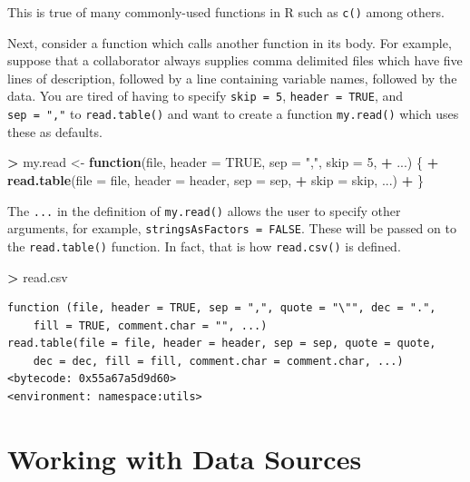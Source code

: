 \documentclass[]{krantz}
\makeatletter
\newenvironment{Shaded}{\begin{snugshade}}{\end{snugshade}}
\newcommand{\KeywordTok}[1]{\textcolor[rgb]{0.27,0.27,0.27}{\textbf{#1}}}
\newcommand{\DataTypeTok}[1]{\textcolor[rgb]{0.27,0.27,0.27}{#1}}
\newcommand{\DecValTok}[1]{\textcolor[rgb]{0.06,0.06,0.06}{#1}}
\newcommand{\StringTok}[1]{\textcolor[rgb]{0.5,0.5,0.5}{#1}}
\newcommand{\OtherTok}[1]{\textcolor[rgb]{0.37,0.37,0.37}{#1}}
\newcommand{\ControlFlowTok}[1]{\textcolor[rgb]{0.27,0.27,0.27}{\textbf{#1}}}
\newcommand{\OperatorTok}[1]{\textcolor[rgb]{0.43,0.43,0.43}{\textbf{#1}}}
\newcommand{\NormalTok}[1]{#1}
\newenvironment{kframe}{%
\medskip{}
\setlength{\fboxsep}{.8em}
 \def\at@end@of@kframe{}%
 \ifinner\ifhmode%
  \def\at@end@of@kframe{\end{minipage}}%
  \begin{minipage}{\columnwidth}%
 \fi\fi%
 \def\FrameCommand##1{\hskip\@totalleftmargin \hskip-\fboxsep
 \colorbox{shadecolor}{##1}\hskip-\fboxsep
     \hskip-\linewidth \hskip-\@totalleftmargin \hskip\columnwidth}%
 \MakeFramed {\advance\hsize-\width
   \@totalleftmargin\z@ \linewidth\hsize
   \@setminipage}}%
 {\par\unskip\endMakeFramed%
 \at@end@of@kframe}
\renewenvironment{Shaded}{\begin{kframe}}{\end{kframe}}
\theoremstyle{definition}
\theoremstyle{definition}
\theoremstyle{definition}
\theoremstyle{remark}
\makeatother
\begin{document}
This is true of many commonly-used functions in R such as \texttt{c()}
among others.

Next, consider a function which calls another function in its body. For
example, suppose that a collaborator always supplies comma delimited
files which have five lines of description, followed by a line
containing variable names, followed by the data. You are tired of having
to specify \texttt{skip\ =\ 5}, \texttt{header\ =\ TRUE}, and
\texttt{sep\ =\ ","} to \texttt{read.table()} and want to create a
function \texttt{my.read()} which uses these as defaults.

\begin{Shaded}
\begin{Highlighting}[]
\OperatorTok{>}\StringTok{ }\NormalTok{my.read <-}\StringTok{ }\ControlFlowTok{function}\NormalTok{(file, }\DataTypeTok{header =} \OtherTok{TRUE}\NormalTok{, }\DataTypeTok{sep =} \StringTok{","}\NormalTok{, }\DataTypeTok{skip =} \DecValTok{5}\NormalTok{, }
\OperatorTok{+}\StringTok{   }\NormalTok{...) \{}
\OperatorTok{+}\StringTok{   }\KeywordTok{read.table}\NormalTok{(}\DataTypeTok{file =}\NormalTok{ file, }\DataTypeTok{header =}\NormalTok{ header, }\DataTypeTok{sep =}\NormalTok{ sep, }
\OperatorTok{+}\StringTok{     }\DataTypeTok{skip =}\NormalTok{ skip, ...)}
\OperatorTok{+}\StringTok{ }\NormalTok{\}}
\end{Highlighting}
\end{Shaded}

The \texttt{...} in the definition of \texttt{my.read()} allows the user
to specify other arguments, for example,
\texttt{stringsAsFactors\ =\ FALSE}. These will be passed on to the
\texttt{read.table()} function. In fact, that is how \texttt{read.csv()}
is defined.

\begin{Shaded}
\begin{Highlighting}[]
\OperatorTok{>}\StringTok{ }\NormalTok{read.csv}
\end{Highlighting}
\end{Shaded}

\begin{verbatim}
function (file, header = TRUE, sep = ",", quote = "\"", dec = ".", 
    fill = TRUE, comment.char = "", ...) 
read.table(file = file, header = header, sep = sep, quote = quote, 
    dec = dec, fill = fill, comment.char = comment.char, ...)
<bytecode: 0x55a67a5d9d60>
<environment: namespace:utils>
\end{verbatim}

\chapter{Working with Data Sources}\label{working-with-data-sources}
\end{document}
